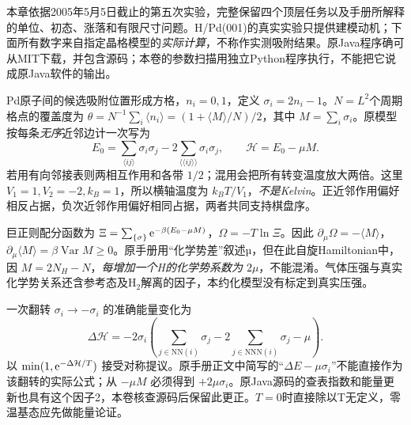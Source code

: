 本章依据2005年5月5日截止的第五次实验，完整保留四个顶层任务以及手册所解释的单位、初态、涨落和有限尺寸问题。H/Pd(001)的真实实验只提供建模动机；下面所有数字来自指定晶格模型的\emph{实际计算}，不称作实测吸附结果。原Java程序确可从MIT下载，并包含源码；本卷的参数扫描用独立Python程序执行，不能把它说成原Java软件的输出。

Pd原子间的候选吸附位置形成方格，$n_i=0,1$，定义 $\sigma_i=2n_i-1$。$N=L^2$个周期格点的覆盖度为 $\theta=N^{-1}\sum_i\langle n_i\rangle=(1+\langle M\rangle/N)/2$，其中 $M=\sum_i\sigma_i$。原模型按每条\emph{无序}近邻边计一次写为
\[
 E_0=\sum_{\langle ij\rangle}\sigma_i\sigma_j
       -2\sum_{\langle\!\langle ij\rangle\!\rangle}\sigma_i\sigma_j,
 \qquad \mathcal H=E_0-\mu M.
\]
若用有向邻接表则两相互作用和各带 $1/2$；混用会把所有转变温度放大两倍。这里 $V_1=1,V_2=-2,k_B=1$，所以横轴温度为 $k_BT/V_1$，\emph{不是Kelvin}。正近邻作用偏好相反占据，负次近邻作用偏好相同占据，两者共同支持棋盘序。

巨正则配分函数为 $\Xi=\sum_{\{\sigma\}}\mathrm e^{-\beta(E_0-\mu M)}$，$\Omega=-T\ln\Xi$。因此 $\partial_\mu\Omega=-\langle M\rangle$，$\partial_\mu\langle M\rangle=\beta\operatorname{Var}M\ge0$。原手册用“化学势差”叙述µ，但在此自旋Hamiltonian中，因 $M=2N_H-N$，\emph{每增加一个H的化学势系数为 $2\mu$}，不能混淆。气体压强与真实化学势关系还含参考态及H$_2$解离的因子，本约化模型没有标定到真实压强。

一次翻转 $\sigma_i\to-\sigma_i$ 的准确能量变化为
\[
 \Delta\mathcal H=-2\sigma_i
 \left(\sum_{j\in\mathrm{NN}(i)}\sigma_j
       -2\sum_{j\in\mathrm{NNN}(i)}\sigma_j-\mu\right).
\]
以 $\min(1,\mathrm e^{-\Delta\mathcal H/T})$ 接受对称提议。原手册正文中简写的“$\Delta E-\mu\sigma_i$”不能直接作为该翻转的实际公式；从 $-\mu M$ 必须得到 $+2\mu\sigma_i$。原Java源码的查表指数和能量更新也具有这个因子2，本卷核查源码后保留此更正。$T=0$时直接除以T无定义，零温基态应先做能量论证。

